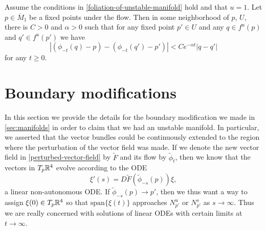 \begin{prop}
	Assume the conditions in \cref{foliation-of-unstable-manifold} hold and that \(u = 1\). Let \(p \in \overline{M}_1\) be a fixed points under the flow. Then in some neighborhood of \(p\), \(U\), there is \(C> 0 \) and \(\alpha > 0\) such that for any fixed point \(p'\in U\) and any \(q \in f^u(p)\) and \(q'\in f^u(p')\) we have
	\begin{equation}
		|(\phi_{-t}(q) - p) - (\phi_{-t}(q') - p')| < C e^{-\alpha t} | q - q'|
	\end{equation}
	for any \(t\geq 0.\)
\end{prop}
\section{Boundary modifications}\label{sec:boundary-modifications}

In this section we provide the details for the boundary modification we made in \cref{sec:manifolds} in order to claim that we had an unstable manifold. In particular, we asserted that the vector bundles could be continuously extended to the region where the perturbation of the vector field was made. If we denote the new vector field in \cref{perturbed-vector-field} by \(\tilde F\) and its flow by \(\tilde \phi_t\), then we know that the vectors in \(T_p\mathbb{R}^4\) evolve according to the ODE
\begin{equation}
	\xi'(s) = D\tilde F(\tilde \phi_{-s}(p)) \xi,
\end{equation}
a linear non-autonomous ODE. If \(\tilde \phi_{-s}(p) \to p'\), then we thus want a way to assign \(\xi(0) \in T_p\mathbb{R}^4\) so that \(\mathrm{span}\{\xi(t)\}\) approaches \(N^u_{p'}\) or \(N^s_{p'}\) as \(s\to \infty\). Thus we are really concerned with solutions of linear ODEs with certain limits at \(t\to\infty\).

